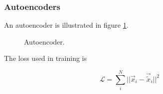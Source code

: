 \subsubsection{Autoencoders}

An autoencoder is illustrated in figure \ref{fig:autoencoder}.

\begin{figure}[!htb]
    \centering
    
    \caption{Autoencoder.}
    \label{fig:autoencoder}
\end{figure}

The loss used in training is

\begin{equation}
    \mathcal{L} = \sum_i^N ||\vec{x}_i - \vec{\tilde{x}}_i||^2
\end{equation}

\pagebreak